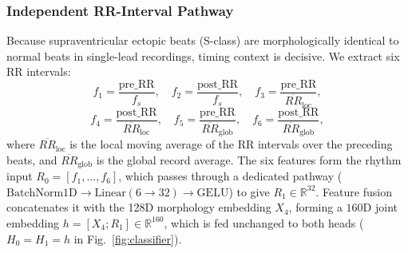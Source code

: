 \subsubsection{Independent RR-Interval Pathway}
Because supraventricular ectopic beats (S-class) are morphologically identical to normal beats in single-lead recordings, timing context is decisive. We extract six RR intervals:
\begin{equation}
f_1 = \frac{\mathrm{pre\_RR}}{f_s}, \quad f_2 = \frac{\mathrm{post\_RR}}{f_s}, \quad f_3 = \frac{\mathrm{pre\_RR}}{\overline{RR}_{\mathrm{loc}}},
\end{equation}
\begin{equation}
f_4 = \frac{\mathrm{post\_RR}}{\overline{RR}_{\mathrm{loc}}}, \quad f_5 = \frac{\mathrm{pre\_RR}}{\overline{RR}_{\mathrm{glob}}}, \quad f_6 = \frac{\mathrm{post\_RR}}{\overline{RR}_{\mathrm{glob}}},
\end{equation}
where $\overline{RR}_{\mathrm{loc}}$ is the local moving average of the RR intervals over the preceding beats, and $\overline{RR}_{\mathrm{glob}}$ is the global record average. The six features form the rhythm input $R_0=[f_1,\dots,f_6]$, which passes through a dedicated pathway ($\mathrm{BatchNorm1D} \to \mathrm{Linear}(6 \to 32) \to \mathrm{GELU}$) to give $R_1\in\mathbb{R}^{32}$. Feature fusion concatenates it with the 128D morphology embedding $X_4$, forming a $160\text{D}$ joint embedding $h=[X_4;R_1] \in \mathbb{R}^{160}$, which is fed unchanged to both heads ($H_0=H_1=h$ in Fig.~\ref{fig:classifier}).

